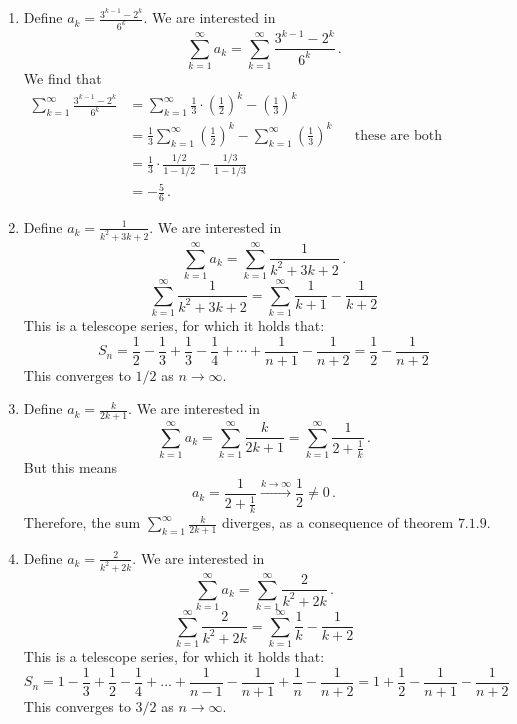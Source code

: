 \documentclass[week=5]{homework}
\begin{document}
\begin{questions}
\begin{enumerate}[label=(\alph*)]
	    	\item Define $a_k = \frac{3^{k-1} - 2^k}{6^k}$. We are interested in 
	    	\[
	    	\sum_{k=1}^{\infty} a_k = \sum_{k=1}^{\infty} \frac{3^{k-1} - 2^k}{6^k}\,.
	    	\]
	    	We find that
	    	\begin{align*}
	    	\sum_{k = 1}^{\infty} \frac{3^{k-1} - 2^k}{6^k} &= \sum_{k = 1}^{\infty} \frac{1}{3} \cdot \left(\frac{1}{2} \right)^k - \left(\frac{1}{3} \right)^k \\
	    	&= \frac{1}{3} \sum_{k = 1}^{\infty} \left(\frac{1}{2} \right)^k - \sum_{k = 1}^{\infty} \left(\frac{1}{3} \right)^k && \mbox{these are both standard geometric series}\\
	    	&= \frac{1}{3} \cdot \frac{1/2}{1 - 1/2} - \frac{1/3}{1 - 1/3} \\
	    	&= - \frac{5}{6}\,.
	    	\end{align*}
	    	
	    	\item Define $a_k = \frac{1}{k^2 + 3k + 2}$. We are interested in 
	    	\[
	    	\sum_{k=1}^{\infty} a_k = \sum_{k=1}^{\infty} \frac{1}{k^2 + 3k + 2}\,.
	    	\]
	    	\[
	    	\sum_{k = 1}^{\infty} \frac{1}{k^2 + 3k + 2} = \sum_{k = 1}^{\infty} \frac{1}{k + 1} - \frac{1}{k + 2} 
	    	\]
	    	This is a telescope series, for which it holds that:
	    	\[
	    	S_n = \frac{1}{2} - \frac{1}{3} + \frac{1}{3} - \frac{1}{4} + \cdots + \frac{1}{n + 1} - \frac{1}{n + 2} = \frac{1}{2} - \frac{1}{n + 2}
	    	\]
	    	This converges to $1/2$ as $n \to \infty$.
	    	
	    	\addtocounter{enumi}{1}
	    	\item Define $a_k = \frac{k}{2k+1}$. We are interested in 
	    	\[
		    	\sum_{k=1}^{\infty} a_k = \sum_{k=1}^{\infty} \frac{k}{2k+1} = \sum_{k = 1}^{\infty} \frac{1}{2 + \frac{1}{k}}\,.
	    	\]
	    	But this means
	    	\[
		    	a_k = \frac{1}{2 + \frac{1}{k}} \xrightarrow{k\to\infty} \frac{1}{2} \neq 0\,.
	    	\]
	    	Therefore, the sum $\sum_{k = 1}^{\infty} \frac{k}{2k + 1}$ diverges, as a consequence of theorem $7.1.9$.
	    	
	    	\item Define $a_k = \frac{2}{k^2+2k}$. We are interested in 
	    	\[
	    	\sum_{k=1}^{\infty} a_k = \sum_{k=1}^{\infty} \frac{2}{k^2+2k}\,.
	    	\] 
	    	\[
	    	\sum_{k = 1}^{\infty} \frac{2}{k^2 + 2k} = \sum_{k = 1}^{\infty} \frac{1}{k} - \frac{1}{k + 2}
	    	\]
	    	This is a telescope series, for which it holds that:
	    	\[
	    	S_n =  1 - \frac{1}{3} + \frac{1}{2} - \frac{1}{4} + ... + \frac{1}{n - 1} - \frac{1}{n + 1} + \frac{1}{n} - \frac{1}{n + 2} = 1 + \frac{1}{2} - \frac{1}{n + 1} - \frac{1}{n + 2}
	    	\]
	    	This converges to $3/2$ as $n \to \infty$.
	    	

\end{enumerate}
\end{questions}
\end{document}
